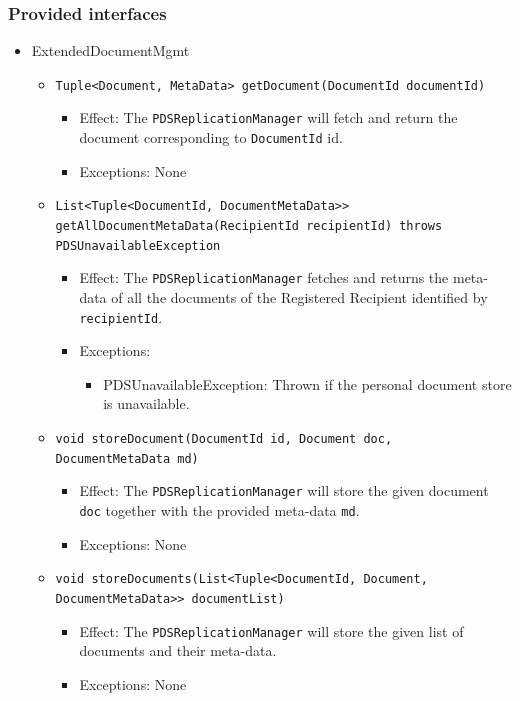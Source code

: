 \documentclass[a4paper,10pt]{article}
\begin{document}
\subsubsection*{Provided interfaces}
\begin{itemize}
    \item  ExtendedDocumentMgmt
    \begin{itemize}
        \item \texttt{Tuple<Document, MetaData> getDocument(DocumentId documentId)}
        \begin{itemize}
            \item Effect: The \texttt{PDSReplicationManager} will fetch and return the document corresponding to \texttt{DocumentId} id.
            \item Exceptions: None
         \end{itemize}
         
         
         
         \item \texttt{List<Tuple<DocumentId, DocumentMetaData>> getAllDocumentMetaData(RecipientId recipientId) throws PDSUnavailableException}
        \begin{itemize}
            \item Effect: The \texttt{PDSReplicationManager} fetches and returns the meta-data of all the documents of the Registered Recipient identified by \texttt{recipientId}.
            \item Exceptions:
            \begin{itemize}
                \item PDSUnavailableException: Thrown if the personal document store is unavailable.
            \end{itemize}
         \end{itemize}
 
		\item \texttt{void storeDocument(DocumentId id, Document doc, DocumentMetaData md)}
        \begin{itemize}
            \item Effect: The \texttt{PDSReplicationManager} will store the given document \texttt{doc} together with the provided meta-data \texttt{md}.
            \item Exceptions:  None 
        \end{itemize}
         
         \item \texttt{void storeDocuments(List<Tuple<DocumentId, Document, DocumentMetaData>> documentList)}
         \begin{itemize}
                \item Effect: The \texttt{PDSReplicationManager} will store the given list of documents and their meta-data.
                \item Exceptions: None
         \end{itemize}
         

\end{itemize}
\end{itemize}
\end{document}
